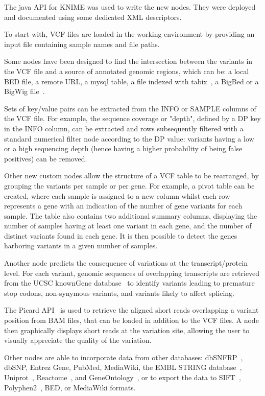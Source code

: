 \documentclass{bioinfo}
\begin{document}
The java API for KNIME was used to write the new nodes. They were deployed and documented using some dedicated XML descriptors.

To start with, VCF files are loaded in the working environment by providing an input file containing sample names and file paths.




Some nodes have been designed to find the intersection between the variants in the VCF file and a source of annotated genomic regions, which can be: a local BED file, a remote URL, a mysql table, a file indexed with tabix~\citep{pmid21208982}, a BigBed or a BigWig file~\citep{pmid20639541}.


Sets of key/value pairs can be extracted from the INFO or SAMPLE columns of the VCF file. For example, the sequence coverage or "depth", defined by a DP key in the INFO column, can be extracted and rows subsequently filtered with a standard numerical filter node according to the DP value: variants having a low or a high sequencing depth (hence having a higher probability of being false positives) can be removed.


Other new custom nodes allow the structure of a VCF table to be rearranged, by grouping the variants per sample or per gene. For example, a pivot table can be created, where each sample is assigned to a new column whilst each row represents a gene with an indication of the number of gene variants for each sample. The table also contains two additional summary columns, displaying the number of samples having at least one variant in each gene, and the number of distinct variants found in each gene. It is then possible to detect the genes harboring variants in a given number of samples.

Another node predicts the consequence of variations at the transcript/protein level. For each variant, genomic sequences of overlapping transcripts are retrieved from the UCSC knownGene database~\citep{pmid16500937} to identify variants leading to premature stop codons, non-synymous variants, and variants likely to affect splicing.

The Picard API~\citep{pmid19505943} is used to retrieve the aligned short reads overlapping a variant position from BAM files, that can be loaded in addition to the VCF files. A node then graphically displays short reads at the variation site, allowing the user to visually appreciate the quality of the variation.

Other nodes are able to incorporate data from other databases: dbSNFRP~\citep{pmid21520341}, dbSNP, Entrez Gene, PubMed, MediaWiki, the EMBL STRING database~\citep{pmid17098935}, Uniprot~\citep{pmid21447597}, Reactome~\citep{pmid21067998}, and GeneOntology~\citep{pmid18957448}, or to export the data to SIFT~\citep{pmid11337480}, Polyphen2~\citep{pmid20354512}, BED, or MediaWiki formats.
\end{document}
